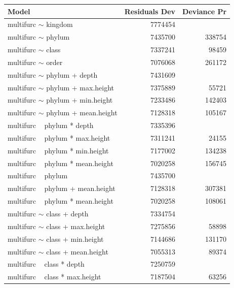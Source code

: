         \begin{center}
          \begin{longtable}{ |l|r|r| }
            \hline
            Model & Residuals Dev & Deviance Pr \\
            \hline \hline
            multifurc $\sim$ kingdom & 7774454 & \\
            multifurc $\sim$ phylum & 7435700 & 338754 \\
            multifurc $\sim$ class & 7337241 & 98459 \\
            \rowcolor{green} multifurc $\sim$ order & 7076068 & 261172 \\
            \hline \hline \hline
            multifurc $\sim$ phylum + depth & 7431609 & \\
            multifurc $\sim$ phylum + max.height & 7375889 & 55721 \\
            multifurc $\sim$ phylum + min.height & 7233486 & 142403 \\
            \rowcolor{green} multifurc $\sim$ phylum + mean.height & 7128318 & 105167 \\
            \hline \hline
            multifurc ~ phylum * depth & 7335396 & \\
            multifurc ~ phylum * max.height & 7311241 & 24155 \\
            multifurc ~ phylum * min.height & 7177002 & 134238 \\
            \rowcolor{green} multifurc ~ phylum * mean.height & 7020258 & 156745 \\
            \hline \hline
            multifurc ~ phylum & 7435700 & \\
            multifurc ~ phylum + mean.height & 7128318 & 307381 \\
            \rowcolor{green} multifurc ~ phylum * mean.height & 7020258 & 108061 \\
            \hline \hline \hline
            multifurc $\sim$ class + depth & 7334754 & \\
            multifurc $\sim$ class + max.height & 7275856 & 58898 \\
            multifurc $\sim$ class + min.height & 7144686 & 131170 \\
            \rowcolor{green} multifurc $\sim$ class + mean.height & 7055313 & 89374 \\
            \hline \hline
            multifurc ~ class * depth & 7250759 & \\
            multifurc ~ class * max.height & 7187504 & 63256 \\

\end{longtable}
\end{center}
